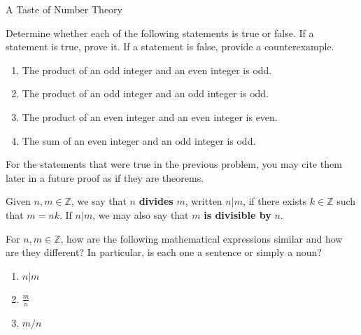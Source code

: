 \begin{section}{A Taste of Number Theory}
\begin{problem}
Determine whether each of the following statements is true or false.  If a statement is true, prove it. If a statement is false, provide a counterexample.
\begin{enumerate}[label=\textrm{(\alph*)}]
\item The product of an odd integer and an even integer is odd.
\item The product of an odd integer and an odd integer is odd.
\item The product of an even integer and an even integer is even.
\item The sum of an even integer and an odd integer is odd.
\end{enumerate}
\end{problem}

For the statements that were true in the previous problem, you may cite them later in a future proof as if they are theorems.


\begin{definition}\label{def:divides}
Given $n,m\in\mathbb{Z}$, we say that $n$ \textbf{divides} $m$, written $\boxed{n|m}$, if there exists $k\in\mathbb{Z}$ such that $m=nk$. If $n|m$, we may also say that $m$ \textbf{is divisible by} $n$.
\end{definition}

\begin{problem}
For $n,m\in\mathbb{Z}$, how are the following mathematical expressions similar and how are they different? In particular, is each one a sentence or simply a noun?
\begin{enumerate}[label=\textrm{(\alph*)}]
\item $n|m$
\item $\displaystyle \frac{m}{n}$
\item $m/n$
\end{enumerate}
\end{problem}


\end{section}
